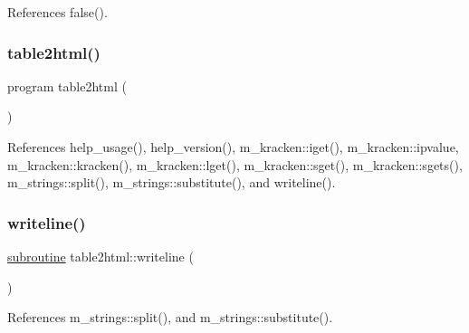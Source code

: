 References false().

\mbox{\label{table2html_8f90_ac9fa6313f884ee5cf8caf9b9bfb9f3cd}} 
\subsubsection{\texorpdfstring{table2html()}{table2html()}}
{\footnotesize\ttfamily program table2html (\begin{DoxyParamCaption}{ }\end{DoxyParamCaption})}



References help\+\_\+usage(), help\+\_\+version(), m\+\_\+kracken\+::iget(), m\+\_\+kracken\+::ipvalue, m\+\_\+kracken\+::kracken(), m\+\_\+kracken\+::lget(), m\+\_\+kracken\+::sget(), m\+\_\+kracken\+::sgets(), m\+\_\+strings\+::split(), m\+\_\+strings\+::substitute(), and writeline().

\mbox{\label{table2html_8f90_a8fd5b1ad7c5297852591499ca1e2db09}} 
\subsubsection{\texorpdfstring{writeline()}{writeline()}}
{\footnotesize\ttfamily \hyperlink{M__stopwatch_83_8txt_acfbcff50169d691ff02d4a123ed70482}{subroutine} table2html\+::writeline (\begin{DoxyParamCaption}{ }\end{DoxyParamCaption})}



References m\+\_\+strings\+::split(), and m\+\_\+strings\+::substitute().


